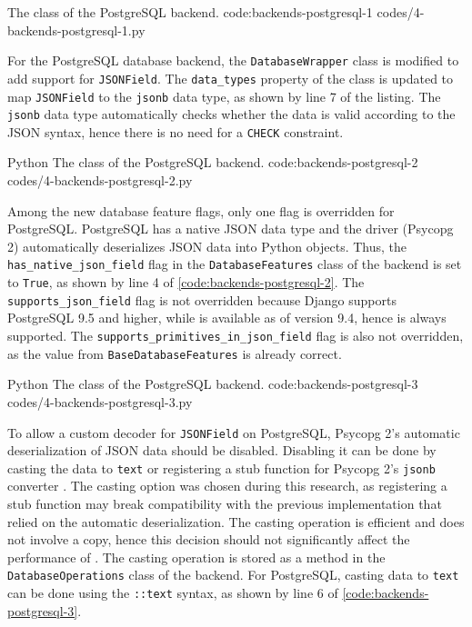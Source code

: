 {The  class of the PostgreSQL backend.}
{code:backends-postgresql-1}
{codes/4-backends-postgresql-1.py}

For the PostgreSQL database backend, the \verb|DatabaseWrapper| class is
modified to add support for \verb|JSONField|. The \verb|data_types| property of
the class is updated to map \verb|JSONField| to the \verb|jsonb| data type, as
shown by line 7 of the listing. The \verb|jsonb| data type automatically checks
whether the data is valid according to the JSON syntax, hence there is no need
for a \verb|CHECK| constraint.

\listing
{Python}
{The  class of the PostgreSQL backend.}
{code:backends-postgresql-2}
{codes/4-backends-postgresql-2.py}

Among the new database feature flags, only one flag is overridden for
PostgreSQL. PostgreSQL has a native JSON data type and the driver (Psycopg 2)
automatically deserializes JSON data into Python objects. Thus, the
\verb|has_native_json_field| flag in the \verb|DatabaseFeatures| class of the
backend is set to \verb|True|, as shown by line 4 of
\autoref{code:backends-postgresql-2}. The \verb|supports_json_field| flag is
not overridden because Django supports PostgreSQL 9.5 and higher, while
 is available as of version 9.4, hence  is always
supported. The \verb|supports_primitives_in_json_field| flag is also not
overridden, as the value from \verb|BaseDatabaseFeatures| is already correct.

\listing
{Python}
{The  class of the PostgreSQL backend.}
{code:backends-postgresql-3}
{codes/4-backends-postgresql-3.py}

To allow a custom decoder for \verb|JSONField| on PostgreSQL, Psycopg 2's
automatic deserialization of JSON data should be disabled. Disabling it can be
done by casting the data to \verb|text| or registering a stub function for
Psycopg 2's \verb|jsonb| converter \cite{psycopg2:json-adaptation}. The casting
option was chosen during this research, as registering a stub function may
break compatibility with the previous implementation that relied on the
automatic deserialization. The casting operation is efficient and does not
involve a copy, hence this decision should not significantly affect the
performance of  \cite{psycopg2:json-adaptation}. The casting
operation is stored as a method in the \verb|DatabaseOperations| class of the
backend. For PostgreSQL, casting data to \verb|text| can be done using the
\verb|::text| syntax, as shown by line 6 of
\autoref{code:backends-postgresql-3}.

